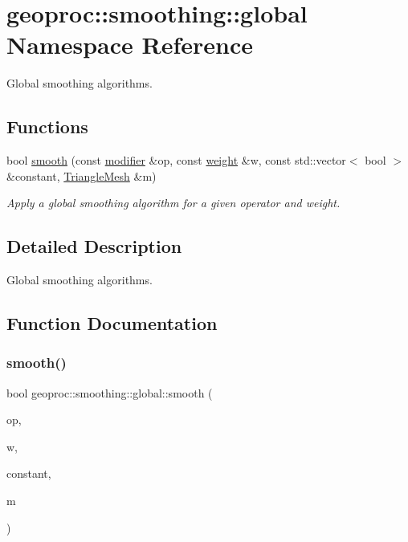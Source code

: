 \hypertarget{namespacegeoproc_1_1smoothing_1_1global}{}\section{geoproc\+:\+:smoothing\+:\+:global Namespace Reference}
\label{namespacegeoproc_1_1smoothing_1_1global}


Global smoothing algorithms.  


\subsection*{Functions}
\begin{DoxyCompactItemize}
\item 
bool \hyperlink{namespacegeoproc_1_1smoothing_1_1global_ac6c034cb72d0a744d0dd843d4df012ff}{smooth} (const \hyperlink{namespacegeoproc_a396280579199558902594f4df72c01c7}{modifier} \&op, const \hyperlink{namespacegeoproc_a12e5a10581b53b9dd9a509127527f843}{weight} \&w, const std\+::vector$<$ bool $>$ \&constant, \hyperlink{classgeoproc_1_1TriangleMesh}{Triangle\+Mesh} \&m)
\begin{DoxyCompactList}\small\item\em Apply a global smoothing algorithm for a given operator and weight. \end{DoxyCompactList}\end{DoxyCompactItemize}


\subsection{Detailed Description}
Global smoothing algorithms. 

\subsection{Function Documentation}
\mbox{\label{namespacegeoproc_1_1smoothing_1_1global_ac6c034cb72d0a744d0dd843d4df012ff}} 
\subsubsection{\texorpdfstring{smooth()}{smooth()}}
{\footnotesize\ttfamily bool geoproc\+::smoothing\+::global\+::smooth (\begin{DoxyParamCaption}\item[{const \hyperlink{namespacegeoproc_a396280579199558902594f4df72c01c7}{modifier} \&}]{op,  }\item[{const \hyperlink{namespacegeoproc_a12e5a10581b53b9dd9a509127527f843}{weight} \&}]{w,  }\item[{const std\+::vector$<$ bool $>$ \&}]{constant,  }\item[{\hyperlink{classgeoproc_1_1TriangleMesh}{Triangle\+Mesh} \&}]{m }\end{DoxyParamCaption})}



